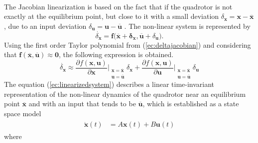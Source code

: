 \\
The Jacobian linearization is based on the fact that if the quadrotor is not exactly at the equilibrium point, but close to it with a small deviation $\delta_{\mathbf{x}} = \mathbf{x} - \overline{\mathbf{x}}$, due to an input deviation $\delta_{\mathbf{u}}= \mathbf{u} - \overline{\mathbf{u}}$ \cite{RanjanVepa2016}. The non-linear system is represented by
\begin{equation}
\label{ec:deltajacobian}
\dot{\delta_{\mathbf{x}}} =  \mathbf{f(\overline{x}+\delta_{\mathbf{x}},\overline{u}}+\delta_{\mathbf{u}}).
\end{equation}
Using the first order Taylor polynomial from (\ref{ec:deltajacobian}) and considering that $\mathbf{f(\overline{x},\overline{u})} \approx \mathbf{0}$, the following expression is obtained.
\begin{equation}
\label{ec:linearizedsystem}
\dot{\delta_{\mathbf{x}}} \approx 
\frac{\partial f(\mathbf{x},\mathbf{u})}{\partial \mathbf{x}}\Bigr|_{\substack{\mathbf{x}=\overline{\mathbf{x}}\\\mathbf{u}=\overline{\mathbf{u}}}} \delta_{\mathbf{x}} + \frac{\partial f(\mathbf{x},\mathbf{u})}{\partial \mathbf{u}}\Bigr|_{\substack{\mathbf{x}=\overline{\mathbf{x}}\\\mathbf{u}=\overline{\mathbf{u}}}} \delta_{\mathbf{u}}
\end{equation}
The equation (\ref{ec:linearizedsystem}) describes a linear time-invariant representation of the non-linear dynamics of the quadrotor near an equilibrium point $\overline{\mathbf{x}}$ and with an input that tends to be $\overline{\mathbf{u}}$, which is established as a state space model
\begin{align}
\begin{split}
\dot{\mathbf{x}}(t) & = A\mathbf{x}(t)+B\mathbf{u}(t)
\end{split}
\end{align}
where
